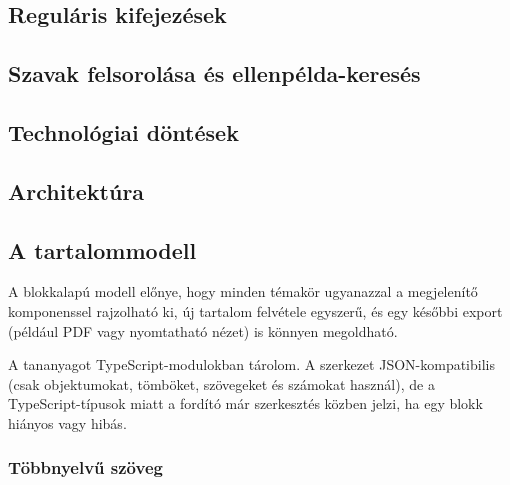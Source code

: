 \subsection{Reguláris kifejezések}
\mbox{}

\subsection{Szavak felsorolása és ellenpélda-keresés}
\mbox{}

\fi
\iffalse


\subsection{Technológiai döntések}
\mbox{}

\subsection{Architektúra}
\mbox{}



\subsection{A tartalommodell}
\label{sec:content-design}

A blokkalapú modell előnye, hogy minden témakör ugyanazzal a
megjelenítő komponenssel rajzolható ki, új tartalom felvétele egyszerű,
és egy későbbi export (például PDF vagy nyomtatható nézet) is könnyen
megoldható.

A tananyagot TypeScript-modulokban tárolom. A szerkezet JSON-kompatibilis
(csak objektumokat, tömböket, szövegeket és számokat használ), de a
TypeScript-típusok miatt a fordító már szerkesztés közben jelzi, ha
egy blokk hiányos vagy hibás.

\subsubsection{Többnyelvű szöveg}

